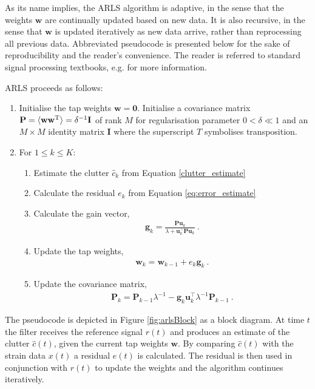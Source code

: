 \documentclass[pra,superscriptaddress,reprint,amsmath,amssymb,nofootinbib]{revtex4-2}
\begin{document}
As its name implies, the ARLS algorithm is adaptive, in the sense that the weights $\mathbf{w}$ are continually updated based on new data. It is also recursive, in the sense that $\mathbf{w}$ is updated iteratively as new data arrive, rather than reprocessing all previous data. Abbreviated pseudocode is presented below for the sake of reproducibility and the reader's convenience. The reader is referred to standard signal processing textbooks, e.g. \cite{HaykinAdaptiveFT:2002} for more information. \newline 

ARLS proceeds as follows:

\begin{enumerate}
	\item Initialise the tap weights $\mathbf{w} = \mathbf{0}$. Initialise a covariance matrix ${\bf P} = \langle {\bf w} {\bf w}^{\rm T} \rangle = \delta^{-1} {\bf I}$ of rank $M$ for regularisation parameter $0 < \delta \ll 1$  and an $M \times M$ identity matrix $\mathbf{I}$ where the superscript $T$ symbolises transposition.
	\item For $1 \leq k \leq K$:
	\begin{enumerate}
		\item Estimate the clutter $\hat{c}_k$ from Equation \eqref{clutter_estimate}
		\item Calculate the residual $e_k$ from Equation \eqref{eq:error_estimate}
		\item Calculate the gain vector,
		\begin{eqnarray}
			\mathbf{g}_k = \frac{\mathbf{P} \mathbf{u}_k}{\lambda + \mathbf{u}_k^{\intercal}\mathbf{P} \mathbf{u}_k} \ .
		\end{eqnarray}
	\item Update the tap weights,
			\begin{eqnarray}
		\mathbf{w}_k = \mathbf{w}_{k-1} +  e_k \mathbf{g}_k  \ .
	\end{eqnarray}
	\item Update the covariance matrix,
\begin{eqnarray}
	\mathbf{P}_k =  \mathbf{P}_{k-1}  \lambda^{-1}  - \mathbf{g}_k \mathbf{u}_k^{\intercal}  \lambda^{-1} \mathbf{P}_{k-1} \ .
\end{eqnarray}

	\end{enumerate}

\end{enumerate}
The pseudocode is depicted in Figure \ref{fig:arlsBlock} as a block diagram. At time $t$ the filter receives the reference signal $r(t)$ and produces an estimate of the clutter $\hat{c}(t)$, given the current tap weights $\mathbf{w}$. By comparing $\hat{c}(t)$ with the strain data $x(t)$ a residual $e(t)$ is calculated. The residual is then used in conjunction with $r(t)$ to update the weights and the algorithm continues iteratively. \newline 
\end{document}
